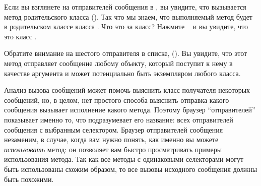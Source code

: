 \documentclass[a4paper,10pt,twoside]{book}
\begin{document}

Если вы взглянете на отправителей сообщения  в , вы увидите, что вызывается метод родительского класса ().  Так что мы знаем, что выполняемый метод будет в родительском классе класса . Что это за класс?  Нажмите ~  и вы увидите, что это класс .


Обратите внимание на шестого отправителя в списке,  (). Вы увидите, что этот метод отправляет сообщение  любому объекту, который поступит к нему в качестве аргумента и может потенциально быть экземпляром любого класса.


Анализ вызова сообщений может помочь выяснить класс получателя некоторых сообщений, но, в целом, нет простого способа выяснить отправка какого сообщения вызывает исполнение какого метода. Поэтому браузер ``отправителей'' показывает именно то, что подразумевает его название: всех отправителей сообщения с выбранным селектором. Браузер отправителей сообщения незаменим, в случае, когда вам нужно понять, как именно вы можете \emph{использовать} метод: он позволяет вам быстро просматривать примеры использования метода.  Так как все методы с одинаковыми селекторами могут быть использованы схожим образом, то все вызовы исходного сообщения должны быть похожими.
\end{document}
